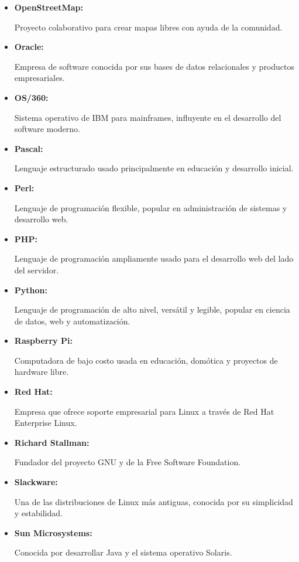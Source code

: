 \documentclass[a4paper,12pt]{article}
\begin{document}
\begin{itemize}
\item \hypertarget{openstreetmap}{\textbf{OpenStreetMap:}} Proyecto colaborativo
para crear mapas libres con ayuda de la comunidad.  \label{openstreetmap}

\item \hypertarget{oracle}{\textbf{Oracle:}} Empresa de software conocida por
sus bases de datos relacionales y productos empresariales.  \label{oracle}

\item \hypertarget{os360}{\textbf{OS/360:}} Sistema operativo de IBM para
mainframes, influyente en el desarrollo del software moderno.  \label{os360}

\item \hypertarget{pascal}{\textbf{Pascal:}} Lenguaje estructurado usado
principalmente en educación y desarrollo inicial.  \label{pascal}

\item \hypertarget{perl}{\textbf{Perl:}} Lenguaje de programación flexible,
popular en administración de sistemas y desarrollo web.  \label{perl}

\item \hypertarget{php}{\textbf{PHP:}} Lenguaje de programación ampliamente
usado para el desarrollo web del lado del servidor.  \label{php}

\item \hypertarget{python}{\textbf{Python:}} Lenguaje de programación de alto
nivel, versátil y legible, popular en ciencia de datos, web y automatización.
\label{python}

\item \hypertarget{raspberrypi}{\textbf{Raspberry Pi:}} Computadora de bajo
costo usada en educación, domótica y proyectos de hardware libre.
\label{raspberrypi}

\item \hypertarget{redhat}{\textbf{Red Hat:}} Empresa que ofrece soporte
empresarial para Linux a través de Red Hat Enterprise Linux.  \label{redhat}

\item \hypertarget{richardstallman}{\textbf{Richard Stallman:}} Fundador del
proyecto GNU y de la Free Software Foundation.  \label{richardstallman}

\item \hypertarget{slackware}{\textbf{Slackware:}} Una de las distribuciones de
Linux más antiguas, conocida por su simplicidad y estabilidad.
\label{slackware}

\item \hypertarget{sun}{\textbf{Sun Microsystems:}} Conocida por desarrollar
Java y el sistema operativo Solaris.  \label{sun}


\end{itemize}
\end{document}
